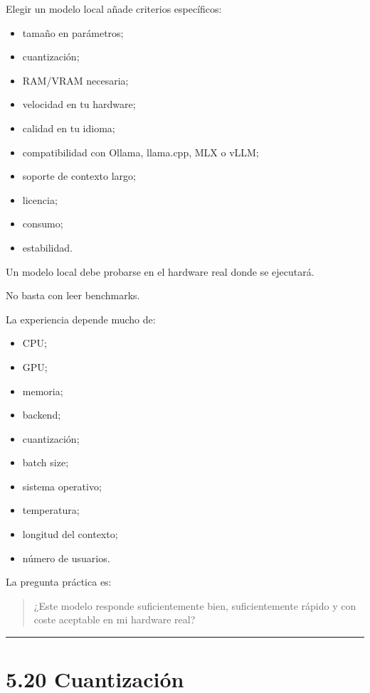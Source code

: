 Elegir un modelo local añade criterios específicos:

\begin{itemize}
\tightlist
\item
  tamaño en parámetros;
\item
  cuantización;
\item
  RAM/VRAM necesaria;
\item
  velocidad en tu hardware;
\item
  calidad en tu idioma;
\item
  compatibilidad con Ollama, llama.cpp, MLX o vLLM;
\item
  soporte de contexto largo;
\item
  licencia;
\item
  consumo;
\item
  estabilidad.
\end{itemize}

Un modelo local debe probarse en el hardware real donde se ejecutará.

No basta con leer benchmarks.

La experiencia depende mucho de:

\begin{itemize}
\tightlist
\item
  CPU;
\item
  GPU;
\item
  memoria;
\item
  backend;
\item
  cuantización;
\item
  batch size;
\item
  sistema operativo;
\item
  temperatura;
\item
  longitud del contexto;
\item
  número de usuarios.
\end{itemize}

La pregunta práctica es:

\begin{quote}
¿Este modelo responde suficientemente bien, suficientemente rápido y con
coste aceptable en mi hardware real?
\end{quote}

\begin{center}\rule{0.5\linewidth}{0.5pt}\end{center}

\section{5.20 Cuantización}\label{cuantizaciuxf3n}

